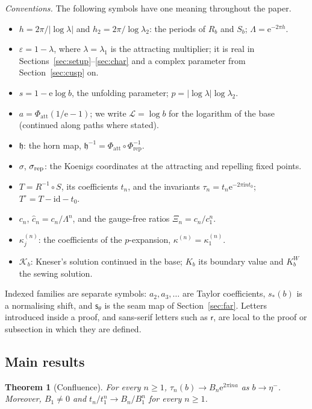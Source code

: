 \documentclass[11pt]{amsart}
\newtheorem{maintheorem}{Theorem}
\theoremstyle{definition}
\newcommand{\Rr}{R}
\newcommand{\Kk}{K}
\newcommand{\eee}{\mathrm{e}}
\newcommand{\ii}{\mathrm{i}}
\begin{document}
\emph{Conventions.}  The following symbols have one meaning throughout the
paper.
\begin{itemize}
\item $h=2\pi/|\log\lambda|$ and $h_2=2\pi/\log\lambda_2$: the periods of
  $\Rr_b$ and $S_b$; $\Lambda=\eee^{-2\pi h}$.
\item $\varepsilon=1-\lambda$, where $\lambda=\lambda_1$ is the attracting
  multiplier; it is real in Sections~\ref{sec:setup}--\ref{sec:char} and a
  complex parameter from Section~\ref{sec:cusp} on.
\item $s=1-\eee\log b$, the unfolding parameter; $p=|\log\lambda|\log\lambda_2$.
\item $a=\Phi_{\mathrm{att}}(1/\eee-1)$; we write $\mathcal L=\log b$ for the
  logarithm of the base (continued along paths where stated).
\item $\mathfrak h$: the horn map, $\mathfrak h^{-1}=\Phi_{\mathrm{att}}\circ\Phi_{\mathrm{rep}}^{-1}$.
\item $\sigma$, $\sigma_{\rm rep}$: the Koenigs coordinates at the attracting and
  repelling fixed points.
\item $T=\Rr^{-1}\circ S$, its coefficients $t_n$, and the invariants
  $\tau_n=t_n\eee^{-2\pi\ii nt_0}$; $T^\circ=T-\mathrm{id}-t_0$.
\item $c_n$, $\hat c_n=c_n/\Lambda^n$, and the gauge-free ratios $\Xi_n=c_n/c_1^n$.
\item $\kappa^{(n)}_j$: the coefficients of the $p$-expansion, $\kappa^{(n)}=\kappa^{(n)}_1$.
\item $\mathcal K_b$: Kneser's solution continued in the base; $\Kk_b$ its
  boundary value and $\Kk^W_b$ the sewing solution.
\end{itemize}
Indexed families are separate symbols: $a_2,a_3,\dots$ are Taylor
coefficients, $s_*(b)$ is a normalising shift, and $\mathsf s_\theta$ is the
seam map of Section~\ref{sec:far}.  Letters introduced inside a proof, and
sans-serif letters such as $\mathsf r$, are local to the proof or subsection
in which they are defined.

\subsection*{Main results}

\begin{maintheorem}[Confluence]\label{mthm:A}
For every $n\ge1$, $\tau_n(b)\to B_n\eee^{2\pi\ii na}$ as $b\to\eta^-$.
Moreover, $B_1\ne0$ and $t_n/t_1^n\to B_n/B_1^n$ for every $n\ge1$.
\end{maintheorem}
\end{document}
